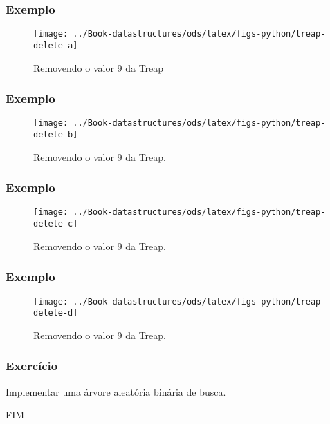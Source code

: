 \documentclass{beamer}
\newcommand{\figlabel}[1]{\label{fig:#1}}
\begin{document}
\begin{frame}[shrink]
\frametitle{Exemplo}
\begin{figure}
  \begin{center}
  \texttt{[image: ../Book-datastructures/ods/latex/figs-python/treap-delete-a]} 
  \end{center}
  \caption[Removendo de uma treap]{Removendo o valor 9 da Treap}
  \figlabel{treap-remove}
\end{figure}
\end{frame}

\begin{frame}[shrink]
\frametitle{Exemplo}
\begin{figure}
  \begin{center}
  \texttt{[image: ../Book-datastructures/ods/latex/figs-python/treap-delete-b]} 
  \end{center}
  \caption[Removendo de uma treap]{Removendo o valor 9 da Treap.}
  \figlabel{treap-remove}
\end{figure}
\end{frame}

\begin{frame}[shrink]
\frametitle{Exemplo}
\begin{figure}
  \begin{center}
  \texttt{[image: ../Book-datastructures/ods/latex/figs-python/treap-delete-c]}
  \end{center}
  \caption[Removendo de uma treap]{Removendo o valor 9 da Treap.}
  \figlabel{treap-remove}
\end{figure}
\end{frame}

\begin{frame}[shrink]
\frametitle{Exemplo}
\begin{figure}
  \begin{center}
  \texttt{[image: ../Book-datastructures/ods/latex/figs-python/treap-delete-d]} 
  \end{center}
  \caption[Removendo de uma treap]{Removendo o valor 9 da Treap.}
  \figlabel{treap-remove}
\end{figure}
\end{frame}
\begin{frame}
\frametitle{Exercício}
Implementar uma árvore aleatória binária de busca.
\end{frame}


\begin{frame}
FIM
\end{frame}
\end{document}
